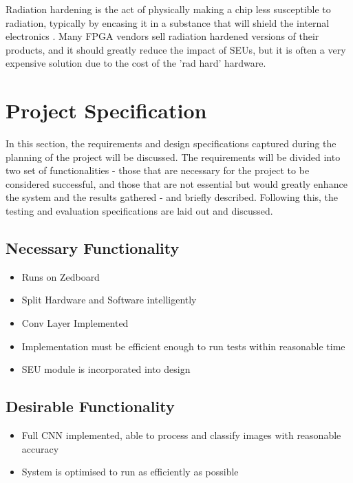 \documentclass[12pt]{article}
\begin{document}
Radiation hardening is the act of physically making a chip less susceptible to radiation, typically by encasing it in a substance that will shield the internal electronics \cite{RadHardFpga}. Many FPGA vendors sell radiation hardened versions of their products, and it should greatly reduce the impact of SEUs, but it is often a very expensive solution due to the cost of the 'rad hard' hardware.

\newpage

\section{Project Specification}
\label{sec:ProjSpec}


In this section, the requirements and design specifications captured during the planning of the project will be discussed. The requirements will be divided into two set of functionalities - those that are necessary for the project to be considered successful, and those that are not essential but would greatly enhance the system and the results gathered - and briefly described. Following this, the testing and evaluation specifications are laid out and discussed.

\subsection{Necessary Functionality}
\label{sec:ProjSpec-Necessary}


\begin{itemize}
\item Runs on Zedboard
\item Split Hardware and Software intelligently
\item Conv Layer Implemented
\item Implementation must be efficient enough to run tests within reasonable time
\item SEU module is incorporated into design
\end{itemize}

\subsection{Desirable Functionality}
\label{sec:ProjSpec-Desirable}


\begin{itemize}
\item Full CNN implemented, able to process and classify images with reasonable accuracy
\item System is optimised to run as efficiently as possible
\end{itemize}
\end{document}
